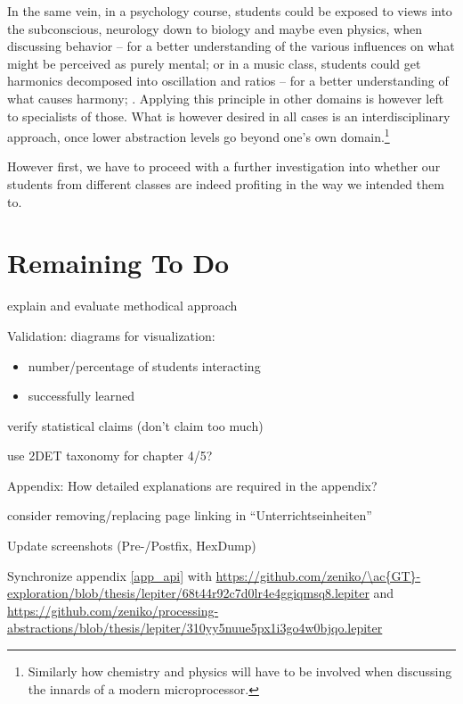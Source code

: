 In the same vein, in a psychology course, students could be exposed to views into the subconscious, neurology down to biology and maybe even physics, when discussing behavior -- for a better understanding of the various influences on what might be perceived as purely mental; or in a music class, students could get harmonics decomposed into oscillation and ratios -- for a better understanding of what causes harmony; \etc. Applying this principle in other domains is however left to specialists of those. What is however desired in all cases is an interdisciplinary approach, once lower abstraction levels go beyond one's own domain.\footnote{Similarly how chemistry and physics will have to be involved when discussing the innards of a modern microprocessor.}

However first, we have to proceed with a further investigation into whether our students from different classes are indeed profiting in the way we intended them to.


\section*{Remaining To Do}

\begin{todo}
\item explain and evaluate methodical approach
\item Validation: diagrams for visualization:
\begin{itemize}
\item number/percentage of students interacting
\item successfully learned
\end{itemize}
\item verify statistical claims (don't claim too much)
\item use 2DET taxonomy for chapter 4/5? \cite{Sor13}
\item Appendix: How detailed explanations are required in the appendix?
\item consider removing/replacing page linking in ``Unterrichtseinheiten''
\item Update screenshots (Pre-/Postfix, HexDump)
\item Synchronize appendix \ref{app_api} with \url{https://github.com/zeniko/\ac{GT}-exploration/blob/thesis/lepiter/68t44r92c7d0lr4e4ggiqmsq8.lepiter} and \url{https://github.com/zeniko/processing-abstractions/blob/thesis/lepiter/310yy5nuue5px1i3go4w0bjqo.lepiter}
\end{todo}
